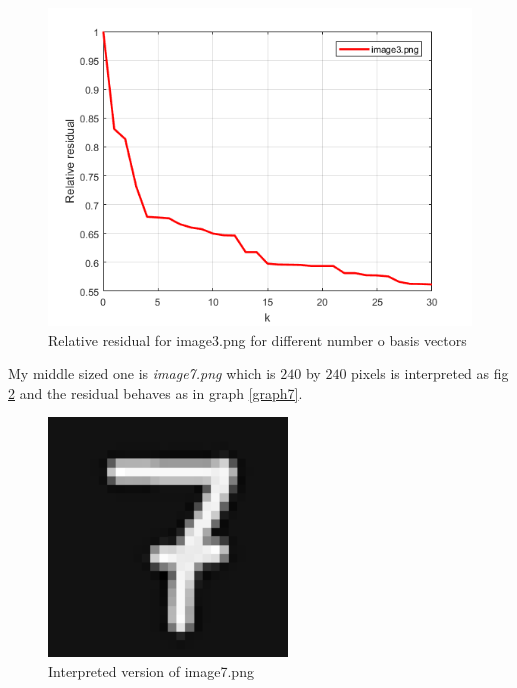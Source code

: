 \documentclass[notitlepage]{report}
\begin{document}
\begin{figure}[!ht]
\centering
\includegraphics[scale=0.575]{image3graph.png}
\caption{Relative residual for image3.png for different number o basis vectors}
\label{graph3}
\end{figure}

My middle sized one is \textit{image7.png} which is $240$ by $240$ pixels is interpreted as fig \ref{out7} and the residual behaves as in graph \ref{graph7}.
\begin{figure}[!ht]
\centering
\includegraphics[scale=0.4]{output7.png}
\caption{Interpreted version of image7.png}
\label{out7}
\end{figure}
\end{document}

